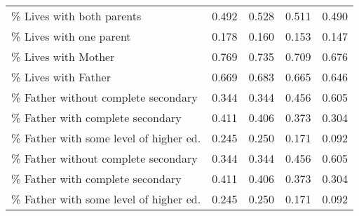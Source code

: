 {\begin{tabular}{lcccc}
\% Lives with both parents&       0.492&       0.528&       0.511&       0.490\\
\% Lives with one parent&       0.178&       0.160&       0.153&       0.147\\
\% Lives with Mother&       0.769&       0.735&       0.709&       0.676\\
\% Lives with Father&       0.669&       0.683&       0.665&       0.646\\
\% Father without complete secondary&       0.344&       0.344&       0.456&       0.605\\
\% Father with complete secondary&       0.411&       0.406&       0.373&       0.304\\
\% Father with some level of higher ed.&       0.245&       0.250&       0.171&       0.092\\
\% Father without complete secondary&       0.344&       0.344&       0.456&       0.605\\
\% Father with complete secondary&       0.411&       0.406&       0.373&       0.304\\
\% Father with some level of higher ed.&       0.245&       0.250&       0.171&       0.092\\

\bottomrule
\end{tabular}
}
